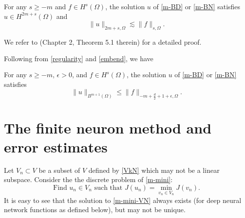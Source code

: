 \begin{lemma}\label{Regularity}
For any $s\ge -m$ and  $f\in H^s(\Omega)$, the solution $u$
  of \eqref{m-BD} or \eqref{m-BN} satisfies $u\in H^{2m+s}(\Omega)$ and 
  \begin{equation}
    \label{regularity}
\|u\|_{2m+s,\Omega}\lesssim     \|f\|_{s,\Omega}.
  \end{equation}
\end{lemma}
We refer to \cite{lions2012non} (Chapter 2, Theorem 5.1 therein) for a detailed proof. 

Following from \eqref{regularity} and \eqref{embend}, we have 
\begin{lemma} For any $s\ge -m$,  $\epsilon >0$, 
 and  $f\in H^s(\Omega)$, the solution $u$
  of \eqref{m-BD} or \eqref{m-BN} satisfies
  \begin{equation}
  \label{Barron-regularity}
\|u\|_{B^{m+1}(\Omega)}\le   \|f\|_{-m+\frac{d}{2}+1+\epsilon,\Omega}.
\end{equation}
\end{lemma}


\section{The finite neuron method and error estimates}\label{sec:FNM}
Let $V_n\subset V$ be a subset of $V$ defined by \eqref{VkN} which may not be a linear
subspace. Consider the the discrete problem of \eqref{m-mini}:
\begin{equation}
  \label{m-mini-VN}
\mbox{Find $u_n\in V_n$ such that } J(u_n)=\min_{v_n\in V_n}J(v_n).
\end{equation}
It is easy to see that the solution to \eqref{m-mini-VN} always exists (for deep
neural network functions as defined below), but may not be unique.

